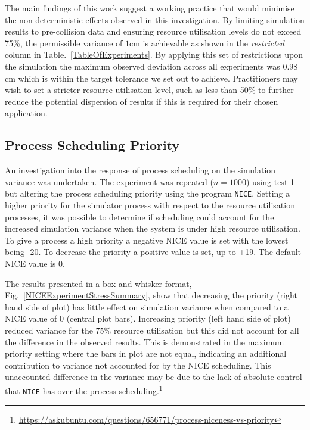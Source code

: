 \documentclass[letterpaper, 10 pt, journal, twoside]{IEEEtran}
\begin{document}
The main findings of this work suggest a working practice that would minimise the non-deterministic effects observed in this investigation. By limiting simulation results to pre-collision data and ensuring resource utilisation levels do not exceed 75\%, the permissible variance of $1$cm is achievable as shown in the \textit{restricted} column in Table.~\ref{TableOfExperiments}. By applying this set of restrictions upon the simulation the maximum observed deviation across all experiments was $0.98$cm which is within the target tolerance we set out to achieve. 
%
Practitioners may wish to set a stricter resource utilisation level, such as less than 50\% to further reduce the potential dispersion of results if this is required for their chosen application. 
%

\subsection{Process Scheduling Priority}
An investigation into the response of process scheduling on the simulation variance was undertaken. The experiment was repeated ($n=1000$) using test 1 but altering the process scheduling priority using the program \texttt{NICE}. Setting a higher priority for the simulator process with respect to the resource utilisation processes, it was possible to determine if scheduling could account for the increased simulation variance when the system is under high resource utilisation.
%
To give a process a high priority a negative NICE value is set with the lowest being -20. To decrease the priority a positive value is set, up to +19. The default NICE value is 0.

The results presented in a box and whisker format, Fig.~\ref{NICEExperimentStressSummary}, show that decreasing the priority (right hand side of plot) has little effect on simulation variance when compared to a NICE value of 0 (central plot bars). Increasing priority (left hand side of plot) reduced variance for the 75\% resource utilisation but this did not account for all the difference in the observed results. This is demonstrated in the maximum priority setting where the bars in plot are not equal, indicating an additional contribution to variance not accounted for by the NICE scheduling. 
%
This unaccounted difference in the variance may be due to the lack of absolute control that \texttt{NICE} has over the process scheduling.\footnote{\url{https://askubuntu.com/questions/656771/process-niceness-vs-priority}}
\end{document}
